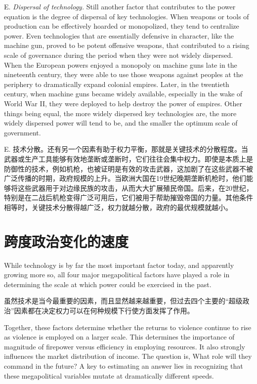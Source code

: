\begin{Parallel}{97mm}{45mm}
  \ParallelLText
  {E. \emph{Dispersal of technology.} Still another factor that contributes to the power equation is the degree of dispersal of key technologies. When weapons or tools of production can be effectively hoarded or monopolized, they tend to centralize power. Even technologies that are essentially defensive in character, like the machine gun, proved to be potent offensive weapons, that contributed to a rising scale of governance during the period when they were not widely dispersed. When the European powers enjoyed a monopoly on machine guns late in the nineteenth century, they were able to use those weapons against peoples at the periphery to dramatically expand colonial empires. Later, in the twentieth century, when machine guns became widely available, especially in the wake of World War II, they were deployed to help destroy the power of empires. Other things being equal, the more widely dispersed key technologies are, the more widely dispersed power will tend to be, and the smaller the optimum scale of government.}
  
  \ParallelRText
  {E. 技术分散。还有另一个因素有助于权力平衡，那就是关键技术的分散程度。当武器或生产工具能够有效地垄断或垄断时，它们往往会集中权力。即使是本质上是防御性的技术，例如机枪，也被证明是有效的攻击武器，这加剧了在这些武器不被广泛传播的时期，政府规模的上升。当欧洲大国在19世纪晚期垄断机枪时，他们能够将这些武器用于对边缘民族的攻击，从而大大扩展殖民帝国。后来，在20世纪，特别是在二战后机枪变得广泛可用后，它们被用于帮助摧毁帝国的力量。其他条件相等时，关键技术分散得越广泛，权力就越分散，政府的最优规模就越小。}
  \ParallelPar

  \section{跨度政治变化的速度}


  \ParallelLText
  {While technology is by far the most important factor today, and apparently growing more so, all four major megapolitical factors have played a role in determining the scale at which power could be exercised in the past.}
  
  \ParallelRText
  {虽然技术是当今最重要的因素，而且显然越来越重要，但过去四个主要的“超级政治”因素都在决定权力可以在何种规模下行使方面发挥了作用。}
  \ParallelPar


  \ParallelLText
  {Together, these factors determine whether the returns to violence continue to rise as violence is employed on a larger scale. This determines the importance of magnitude of firepower versus efficiency in employing resources. It also strongly influences the market distribution of income. The question is, What role will they command in the future? A key to estimating an answer lies in recognizing that these megapolitical variables mutate at dramatically different speeds.}
  

\end{Parallel}

